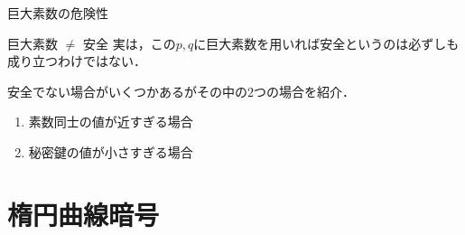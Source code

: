 \documentclass[11pt, aspectratio=169]{beamer}
\begin{document}
\begin{frame}{巨大素数の危険性}
  \begin{alertblock}{巨大素数 $\neq$ 安全}
    実は，この$p,q$に巨大素数を用いれば安全というのは必ずしも成り立つわけではない．
  \end{alertblock}

  \vspace{1em}

  安全でない場合がいくつかあるがその中の$2$つの場合を紹介．
  \begin{enumerate}
    \item 素数同士の値が近すぎる場合
    \item 秘密鍵の値が小さすぎる場合
  \end{enumerate}
\end{frame}

\section{楕円曲線暗号}
\end{document}

